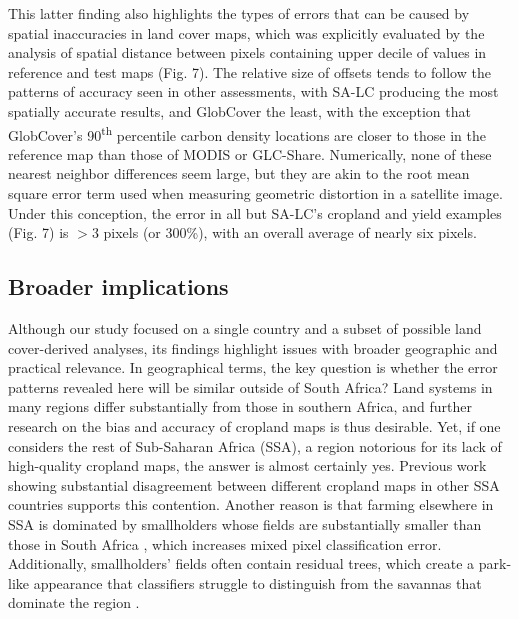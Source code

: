 \documentclass[12 pt, titlepage, a4paper]{article}
\begin{document}
This latter finding also highlights the types of errors that can be caused by spatial inaccuracies in land cover maps, which was explicitly evaluated by the analysis of spatial distance between pixels containing upper decile of values in reference and test maps (Fig. 7).  The relative size of offsets tends to follow the patterns of accuracy seen in other assessments, with SA-LC producing the most spatially accurate results, and GlobCover the least, with the exception that GlobCover's 90\textsuperscript{th} percentile carbon density locations are closer to those in the reference map than those of MODIS or GLC-Share.  Numerically, none of these nearest neighbor differences seem large, but they are akin to the root mean square error term used when measuring geometric distortion in a satellite image. Under this conception, the error in all but SA-LC's cropland and yield examples (Fig. 7) is $>$3 pixels (or 300\%), with an overall average of nearly six pixels.  

\vspace{-0.3 cm}
\subsection*{Broader implications}
\vspace{-0.2 cm}
Although our study focused on a single country and a subset of possible land cover-derived analyses, its findings highlight issues with broader geographic and practical relevance. In geographical terms, the key question is whether the error patterns revealed here will be similar outside of South Africa? Land systems in many regions differ substantially from those in southern Africa, and further research on the bias and accuracy of cropland maps is thus desirable. Yet, if one considers the rest of Sub-Saharan Africa (SSA), a region notorious for its lack of high-quality cropland maps, the answer is almost certainly yes. Previous work showing substantial disagreement between different cropland maps in other SSA countries \citep{fritz_comparison_2010} supports this contention. Another reason is that farming elsewhere in SSA is dominated by smallholders whose fields are substantially smaller than those in South Africa \citep{samberg_subnational_2016}, which increases mixed pixel classification error. Additionally, smallholders' fields often contain residual trees, which create a park-like appearance that classifiers struggle to distinguish from the savannas that dominate the region \citep{estes_reconciling_2016,debats_generalized_2016,sweeney_mapping_2015}.   
\end{document}
